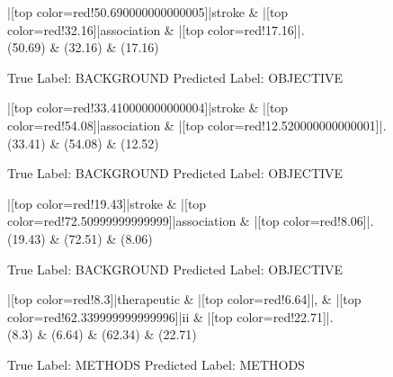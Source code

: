 \documentclass[a4paper, landscape]{article}
\begin{document}
\clearpage
\begin{figure}
\begin{center}
\begin{dependency}
\begin{deptext}
|[top color=red!50.690000000000005]|stroke \& |[top color=red!32.16]|association \& |[top color=red!17.16]|.\\
(50.69) \& (32.16) \& (17.16)\\
\end{deptext}
\end{dependency}
\end{center}
\caption{True Label: BACKGROUND Predicted Label: OBJECTIVE}
\end{figure}
\clearpage
\begin{figure}
\begin{center}
\begin{dependency}
\begin{deptext}
|[top color=red!33.410000000000004]|stroke \& |[top color=red!54.08]|association \& |[top color=red!12.520000000000001]|.\\
(33.41) \& (54.08) \& (12.52)\\
\end{deptext}
\end{dependency}
\end{center}
\caption{True Label: BACKGROUND Predicted Label: OBJECTIVE}
\end{figure}
\clearpage
\begin{figure}
\begin{center}
\begin{dependency}
\begin{deptext}
|[top color=red!19.43]|stroke \& |[top color=red!72.50999999999999]|association \& |[top color=red!8.06]|.\\
(19.43) \& (72.51) \& (8.06)\\
\end{deptext}
\end{dependency}
\end{center}
\caption{True Label: BACKGROUND Predicted Label: OBJECTIVE}
\end{figure}
\clearpage
\begin{figure}
\begin{center}
\begin{dependency}
\begin{deptext}
|[top color=red!8.3]|therapeutic \& |[top color=red!6.64]|, \& |[top color=red!62.339999999999996]|ii \& |[top color=red!22.71]|.\\
(8.3) \& (6.64) \& (62.34) \& (22.71)\\
\end{deptext}
\end{dependency}
\end{center}
\caption{True Label: METHODS Predicted Label: METHODS}
\end{figure}
\end{document}

